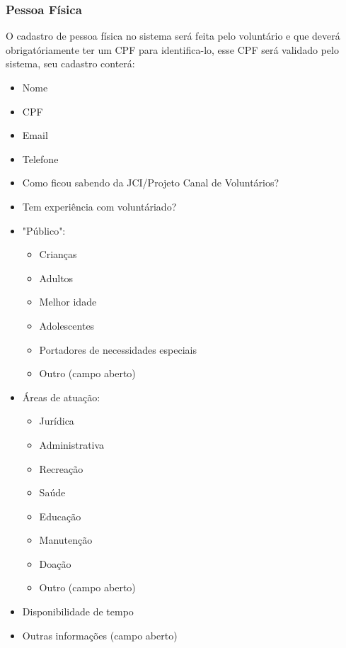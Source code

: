       \subsubsection{Pessoa Física}
      O cadastro de pessoa física no sistema será feita pelo voluntário e que deverá obrigatóriamente ter um CPF para identifica-lo, esse CPF será validado pelo sistema, seu cadastro conterá:
        \begin{itemize}
        \item Nome
        \item CPF
        \item Email
        \item Telefone
        \item Como ficou sabendo da JCI/Projeto Canal de Voluntários?
        \item Tem experiência com voluntáriado?
        \item "Público":
          \begin{itemize}
          \item Crianças
          \item Adultos
          \item Melhor idade
          \item Adolescentes
          \item Portadores de necessidades especiais
          \item Outro (campo aberto)
          \end{itemize}
        \item Áreas de atuação:
          \begin{itemize}
            \item Jurídica
            \item Administrativa
            \item Recreação
            \item Saúde
            \item Educação
            \item Manutenção
            \item Doação
            \item Outro (campo aberto)
          \end{itemize}
        \item Disponibilidade de tempo
        \item Outras informações (campo aberto)
        \end{itemize}

